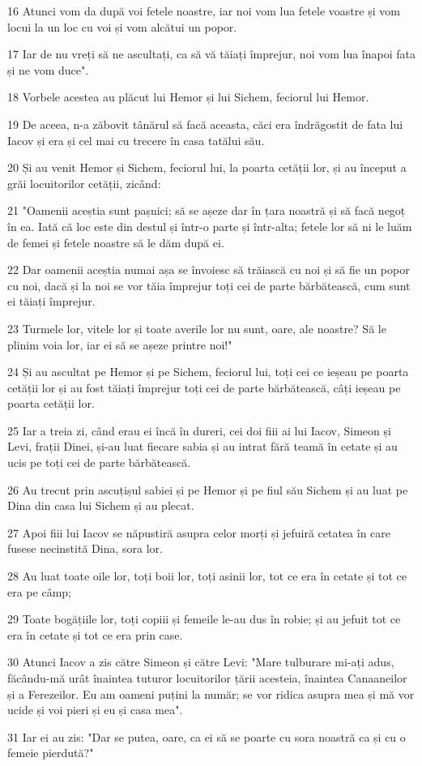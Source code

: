 \par 16 Atunci vom da după voi fetele noastre, iar noi vom lua fetele voastre și vom locui la un loc cu voi și vom alcătui un popor.
\par 17 Iar de nu vreți să ne ascultați, ca să vă tăiați împrejur, noi vom lua înapoi fata și ne vom duce".
\par 18 Vorbele acestea au plăcut lui Hemor și lui Sichem, feciorul lui Hemor.
\par 19 De aceea, n-a zăbovit tânărul să facă aceasta, căci era îndrăgostit de fata lui Iacov și era și cel mai cu trecere în casa tatălui său.
\par 20 Și au venit Hemor și Sichem, feciorul lui, la poarta cetății lor, și au început a grăi locuitorilor cetății, zicând:
\par 21 "Oamenii aceștia sunt pașnici; să se așeze dar în țara noastră și să facă negoț în ea. Iată că loc este din destul și într-o parte și într-alta; fetele lor să ni le luăm de femei și fetele noastre să le dăm după ei.
\par 22 Dar oamenii aceștia numai așa se învoiesc să trăiască cu noi și să fie un popor cu noi, dacă și la noi se vor tăia împrejur toți cei de parte bărbătească, cum sunt ei tăiați împrejur.
\par 23 Turmele lor, vitele lor și toate averile lor nu sunt, oare, ale noastre? Să le plinim voia lor, iar ei să se așeze printre noi!"
\par 24 Și au ascultat pe Hemor și pe Sichem, feciorul lui, toți cei ce ieșeau pe poarta cetății lor și au fost tăiați împrejur toți cei de parte bărbătească, câți ieșeau pe poarta cetății lor.
\par 25 Iar a treia zi, când erau ei încă în dureri, cei doi fiii ai lui Iacov, Simeon și Levi, frații Dinei, și-au luat fiecare sabia și au intrat fără teamă în cetate și au ucis pe toți cei de parte bărbătească.
\par 26 Au trecut prin ascuțișul sabiei și pe Hemor și pe fiul său Sichem și au luat pe Dina din casa lui Sichem și au plecat.
\par 27 Apoi fiii lui Iacov se năpustiră asupra celor morți și jefuiră cetatea în care fusese necinstită Dina, sora lor.
\par 28 Au luat toate oile lor, toți boii lor, toți asinii lor, tot ce era în cetate și tot ce era pe câmp;
\par 29 Toate bogățiile lor, toți copiii și femeile le-au dus în robie; și au jefuit tot ce era în cetate și tot ce era prin case.
\par 30 Atunci Iacov a zis către Simeon și către Levi: "Mare tulburare mi-ați adus, făcându-mă urât înaintea tuturor locuitorilor țării acesteia, înaintea Canaaneilor și a Ferezeilor. Eu am oameni puțini la număr; se vor ridica asupra mea și mă vor ucide și voi pieri și eu și casa mea".
\par 31 Iar ei au zis: "Dar se putea, oare, ca ei să se poarte cu sora noastră ca și cu o femeie pierdută?"

